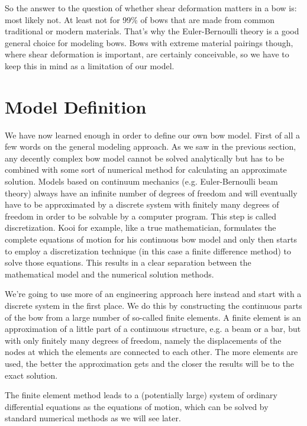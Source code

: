 So the answer to the question of whether shear deformation matters in a bow is: most likely not.
At least not for 99\% of bows that are made from common traditional or modern materials.
That's why the Euler-Bernoulli theory is a good general choice for modeling bows.
Bows with extreme material pairings though, where shear deformation is important, are certainly conceivable, so we have to keep this in mind as a limitation of our model.

\newpage
\section{Model Definition}

We have now learned enough in order to define our own bow model. First of all a few words on the general modeling approach. As we saw in the previous section, any decently complex bow model cannot be solved analytically but has to be combined with some sort of numerical method for calculating an approximate solution. Models based on continuum mechanics (e.g. Euler-Bernoulli beam theory) always have an infinite number of degrees of freedom and will eventually have to be approximated by a discrete system with finitely many degrees of freedom in order to be solvable by a computer program. This step is called discretization. Kooi for example, like a true mathematician, formulates the complete equations of motion for his continuous bow model and only then starts to employ a discretization technique (in this case a finite difference method) to solve those equations. This results in a clear separation between the mathematical model and the numerical solution methods.

We're going to use more of an engineering approach here instead and start with a discrete system in the first place. We do this by constructing the continuous parts of the bow from a large number of so-called finite elements. A finite element is an approximation of a little part of a continuous structure, e.g. a beam or a bar, but with only finitely many degrees of freedom, namely the displacements of the nodes at which the elements are connected to each other. The more elements are used, the better the approximation gets and the closer the results will be to the exact solution.

The finite element method leads to a (potentially large) system of ordinary differential equations as the equations of motion, which can be solved by standard numerical methods as we will see later.

